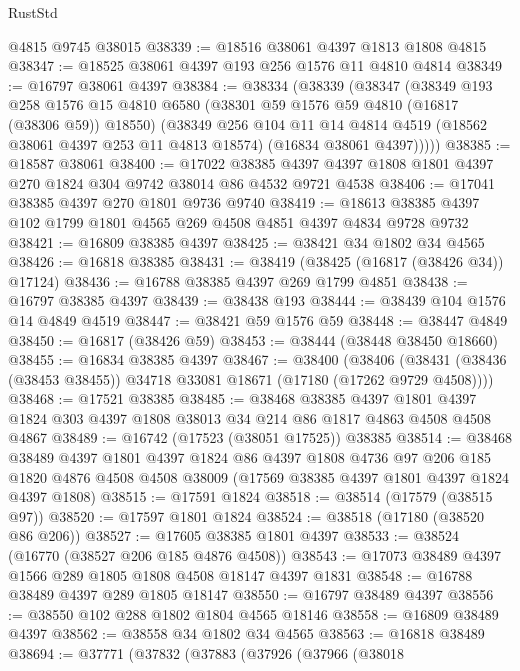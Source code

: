 \begin{lexlean}{RustStd}
\begin{coremodule}
    @4815
    @9745
    @38015
@38339 := @18516 @38061 @4397 @1813 @1808 @4815
@38347 := @18525 @38061 @4397 @193 @256 @1576 @11 @4810 @4814
@38349 := @16797 @38061 @4397
@38384 := @38334
    (@38339
      (@38347
        (@38349
          @193
          @258
          @1576
          @15
          @4810
          @6580
          (@38301 @59 @1576 @59 @4810 (@16817 (@38306 @59)) @18550)
          (@38349
            @256
            @104
            @11
            @14
            @4814
            @4519
            (@18562 @38061 @4397 @253 @11 @4813 @18574)
            (@16834 @38061 @4397)))))
@38385 := @18587 @38061
@38400 := @17022
    @38385
    @4397
    @4397
    @1808
    @1801
    @4397
    @270
    @1824
    @304
    @9742
    @38014
    @86
    @4532
    @9721
    @4538
@38406 := @17041 @38385 @4397 @270 @1801 @9736 @9740
@38419 := @18613 @38385 @4397 @102 @1799 @1801 @4565 @269 @4508 @4851 @4397 @4834 @9728 @9732
@38421 := @16809 @38385 @4397
@38425 := @38421 @34 @1802 @34 @4565
@38426 := @16818 @38385
@38431 := @38419 (@38425 (@16817 (@38426 @34)) @17124)
@38436 := @16788 @38385 @4397 @269 @1799 @4851
@38438 := @16797 @38385 @4397
@38439 := @38438 @193
@38444 := @38439 @104 @1576 @14 @4849 @4519
@38447 := @38421 @59 @1576 @59
@38448 := @38447 @4849
@38450 := @16817 (@38426 @59)
@38453 := @38444 (@38448 @38450 @18660)
@38455 := @16834 @38385 @4397
@38467 := @38400
    (@38406 (@38431 (@38436 (@38453 @38455)) @34718 @33081 @18671 (@17180 (@17262 @9729 @4508))))
@38468 := @17521 @38385
@38485 := @38468
    @38385
    @4397
    @1801
    @4397
    @1824
    @303
    @4397
    @1808
    @38013
    @34
    @214
    @86
    @1817
    @4863
    @4508
    @4508
    @4867
@38489 := @16742 (@17523 (@38051 @17525)) @38385
@38514 := @38468
    @38489
    @4397
    @1801
    @4397
    @1824
    @86
    @4397
    @1808
    @4736
    @97
    @206
    @185
    @1820
    @4876
    @4508
    @4508
    @38009
    (@17569 @38385 @4397 @1801 @4397 @1824 @4397 @1808)
@38515 := @17591 @1824
@38518 := @38514 (@17579 (@38515 @97))
@38520 := @17597 @1801 @1824
@38524 := @38518 (@17180 (@38520 @86 @206))
@38527 := @17605 @38385 @1801 @4397
@38533 := @38524 (@16770 (@38527 @206 @185 @4876 @4508))
@38543 := @17073 @38489 @4397 @1566 @289 @1805 @1808 @4508 @18147 @4397 @1831
@38548 := @16788 @38489 @4397 @289 @1805 @18147
@38550 := @16797 @38489 @4397
@38556 := @38550 @102 @288 @1802 @1804 @4565 @18146
@38558 := @16809 @38489 @4397
@38562 := @38558 @34 @1802 @34 @4565
@38563 := @16818 @38489
@38694 := @37771
    (@37832
      (@37883
        (@37926
          (@37966
            (@38018

\end{coremodule}
\end{lexlean}
